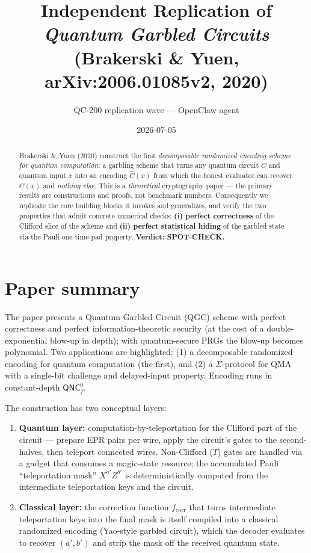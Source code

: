 \documentclass[11pt]{article}
\title{Independent Replication of \\ \emph{Quantum Garbled Circuits} \\
  (Brakerski \& Yuen, arXiv:2006.01085v2, 2020)}
\author{QC-200 replication wave --- OpenClaw agent}
\date{2026-07-05}
\begin{document}
\maketitle

\begin{abstract}
Brakerski \& Yuen (2020) construct the first \emph{decomposable randomized encoding scheme
for quantum computation}: a garbling scheme that turns any quantum circuit $C$ and quantum
input $x$ into an encoding $\hat C(x)$ from which the honest evaluator can recover $C(x)$
and \emph{nothing else}. This is a \emph{theoretical} cryptography paper --- the primary
results are constructions and proofs, not benchmark numbers. Consequently we replicate the
core building blocks it invokes and generalizes, and verify the two properties that admit
concrete numerical checks: \textbf{(i) perfect correctness} of the Clifford slice of the
scheme and \textbf{(ii) perfect statistical hiding} of the garbled state via the Pauli
one-time-pad property. \textbf{Verdict: SPOT-CHECK.}
\end{abstract}

\section{Paper summary}
The paper presents a Quantum Garbled Circuit (QGC) scheme with perfect correctness and
perfect information-theoretic security (at the cost of a double-exponential blow-up in
depth); with quantum-secure PRGs the blow-up becomes polynomial. Two applications are
highlighted: (1) a decomposable randomized encoding for quantum computation (the first),
and (2) a $\Sigma$-protocol for QMA with a single-bit challenge and delayed-input
property. Encoding runs in constant-depth $\mathsf{QNC}^0_f$.

The construction has two conceptual layers:
\begin{enumerate}
  \item \textbf{Quantum layer:} computation-by-teleportation for the Clifford part of the
        circuit --- prepare EPR pairs per wire, apply the circuit's gates to the
        second-halves, then teleport connected wires. Non-Clifford ($T$) gates are handled
        via a gadget that consumes a magic-state resource; the accumulated Pauli
        ``teleportation mask'' $X^{a'} Z^{b'}$ is deterministically computed from the
        intermediate teleportation keys and the circuit.
  \item \textbf{Classical layer:} the correction function $f_{\text{corr}}$ that turns
        intermediate teleportation keys into the final mask is itself compiled into a
        classical randomized encoding (Yao-style garbled circuit), which the decoder
        evaluates to recover $(a',b')$ and strip the mask off the received quantum state.
\end{enumerate}
\end{document}
